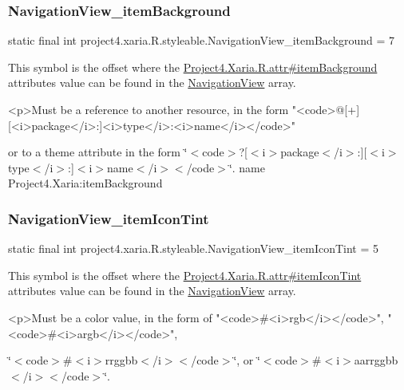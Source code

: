 \subsubsection{\texorpdfstring{Navigation\+View\+\_\+item\+Background}{NavigationView\_itemBackground}}
{\footnotesize\ttfamily static final int project4.\+xaria.\+R.\+styleable.\+Navigation\+View\+\_\+item\+Background = 7\hspace{0.3cm}{\ttfamily [static]}}

This symbol is the offset where the \hyperlink{}{Project4.\+Xaria.\+R.\+attr\#item\+Background} attribute\textquotesingle{}s value can be found in the \hyperlink{classproject4_1_1xaria_1_1R_1_1styleable_a93b7138d1a19f728c4d3933a75ce23e2}{Navigation\+View} array.

\begin{DoxyVerb}      <p>Must be a reference to another resource, in the form "<code>@[+][<i>package</i>:]<i>type</i>:<i>name</i></code>"
\end{DoxyVerb}
 or to a theme attribute in the form \char`\"{}$<$code$>$?\mbox{[}$<$i$>$package$<$/i$>$\+:\mbox{]}\mbox{[}$<$i$>$type$<$/i$>$\+:\mbox{]}$<$i$>$name$<$/i$>$$<$/code$>$\char`\"{}.  name Project4.\+Xaria\+:item\+Background \mbox{\label{classproject4_1_1xaria_1_1R_1_1styleable_a205b41948506e966136578f28f200761}} 
\subsubsection{\texorpdfstring{Navigation\+View\+\_\+item\+Icon\+Tint}{NavigationView\_itemIconTint}}
{\footnotesize\ttfamily static final int project4.\+xaria.\+R.\+styleable.\+Navigation\+View\+\_\+item\+Icon\+Tint = 5\hspace{0.3cm}{\ttfamily [static]}}

This symbol is the offset where the \hyperlink{}{Project4.\+Xaria.\+R.\+attr\#item\+Icon\+Tint} attribute\textquotesingle{}s value can be found in the \hyperlink{classproject4_1_1xaria_1_1R_1_1styleable_a93b7138d1a19f728c4d3933a75ce23e2}{Navigation\+View} array.

\begin{DoxyVerb}      <p>Must be a color value, in the form of "<code>#<i>rgb</i></code>", "<code>#<i>argb</i></code>",
\end{DoxyVerb}
 \char`\"{}$<$code$>$\#$<$i$>$rrggbb$<$/i$>$$<$/code$>$\char`\"{}, or \char`\"{}$<$code$>$\#$<$i$>$aarrggbb$<$/i$>$$<$/code$>$\char`\"{}. 

